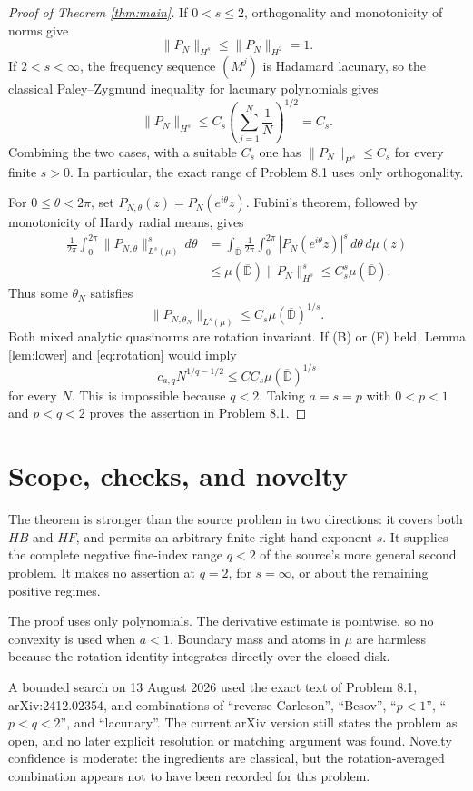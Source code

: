 \documentclass[11pt]{article}
\newcommand{\olD}{\overline{\mathbb D}}
\begin{document}
\begin{proof}[Proof of Theorem \ref{thm:main}]
If $0<s\le2$, orthogonality and monotonicity of norms give
\[
 \|P_N\|_{H^s}\le \|P_N\|_{H^2}=1.
\]
If $2<s<\infty$, the frequency sequence $(M^j)$ is Hadamard lacunary, so the
classical Paley--Zygmund inequality for lacunary polynomials
\cite[Ch.~V]{Zygmund} gives
\[
 \|P_N\|_{H^s}\le C_s
 \left(\sum_{j=1}^N\frac1N\right)^{1/2}=C_s.
\]
Combining the two cases, with a suitable $C_s$ one has
$\|P_N\|_{H^s}\le C_s$ for every finite $s>0$.
In particular, the exact range of Problem 8.1 uses only orthogonality.

For $0\le\theta<2\pi$, set $P_{N,\theta}(z)=P_N(e^{i\theta}z)$.  Fubini's
theorem, followed by monotonicity of Hardy radial means, gives
\begin{align*}
 \frac1{2\pi}\int_0^{2\pi}\|P_{N,\theta}\|_{L^s(\mu)}^s\,d\theta
 &=\int_{\olD}\frac1{2\pi}\int_0^{2\pi}|P_N(e^{i\theta}z)|^s
 \,d\theta\,d\mu(z)\\
 &\le \mu(\olD)\|P_N\|_{H^s}^s
 \le C_s^s\mu(\olD).
\end{align*}
Thus some $\theta_N$ satisfies
\[
 \|P_{N,\theta_N}\|_{L^s(\mu)}\le C_s\mu(\olD)^{1/s}. \label{eq:rotation}
\]
Both mixed analytic quasinorms are rotation invariant.  If (B) or (F) held,
Lemma \ref{lem:lower} and \eqref{eq:rotation} would imply
\[
 c_{a,q}N^{1/q-1/2}\le CC_s\mu(\olD)^{1/s}
\]
for every $N$.  This is impossible because $q<2$.  Taking $a=s=p$ with
$0<p<1$ and $p<q<2$ proves the assertion in Problem 8.1.
\end{proof}

\section{Scope, checks, and novelty}

The theorem is stronger than the source problem in two directions: it covers
both $HB$ and $HF$, and permits an arbitrary finite right-hand exponent $s$.
It supplies the complete negative fine-index range $q<2$ of the source's more
general second problem.  It makes no assertion at $q=2$, for $s=\infty$, or
about the remaining positive regimes.

The proof uses only polynomials.  The derivative estimate is pointwise, so no
convexity is used when $a<1$.  Boundary mass and atoms in $\mu$ are harmless
because the rotation identity integrates directly over the closed disk.

A bounded search on 13 August 2026 used the exact text of Problem 8.1,
arXiv:2412.02354, and combinations of ``reverse Carleson'', ``Besov'',
``$p<1$'', ``$p<q<2$'', and ``lacunary''.  The current arXiv version still
states the problem as open, and no later explicit resolution or matching
argument was found.  Novelty confidence is moderate: the ingredients are
classical, but the rotation-averaged combination appears not to have been
recorded for this problem.
\end{document}
